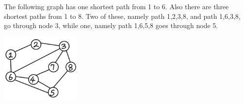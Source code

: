 \documentclass[11pt,fleqn]{exam}
\begin{document}
\vspace{.1in}

 The following graph has one shortest path from 1 to 6. Also there are three shortest paths from 1 to 8. Two of these,
namely path 1,2,3,8, and path 1,6,3,8, go through node 3, while one, namely path 1,6,5,8 goes through node 5.

\vspace{.1in}

\hspace{.5in} \includegraphics[width=0.3\textwidth]{a2-graph1.pdf}

\vspace{.1in}
\end{document}
